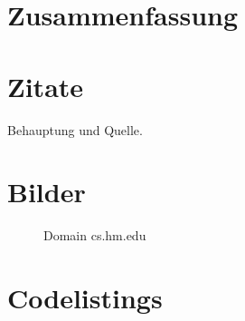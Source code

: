 
\pagestyle{empty}






\pagestyle{useheadings} %



\chapter*{Zusammenfassung}
\lipsum[1]

\tableofcontents
\listoffigures
\listoftables
\lstlistoflistings
\clearpage

















\chapter{Zitate}
Behauptung und Quelle. \citep{sixt_bitcoins_2017}


\chapter{Bilder}

\begin{figure}[!hbt]
    
    \caption{Domain cs.hm.edu}\label{dns}
\end{figure}






\chapter{Codelistings}



